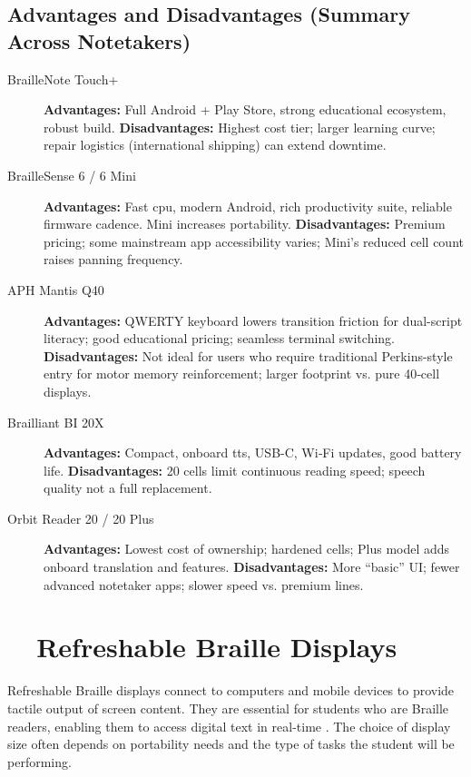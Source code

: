 \subsection*{Advantages and Disadvantages (Summary Across Notetakers)}
\begin{description}
	\item[BrailleNote Touch+] \textbf{Advantages:} Full Android + Play Store, strong educational ecosystem, robust build. \textbf{Disadvantages:} Highest cost tier; larger learning curve; repair logistics (international shipping) can extend downtime.
	\item[BrailleSense 6 / 6 Mini] \textbf{Advantages:} Fast \gls{cpu}, modern Android, rich productivity suite, reliable firmware cadence. Mini increases portability. \textbf{Disadvantages:} Premium pricing; some mainstream app accessibility varies; Mini’s reduced cell count raises panning frequency.
	\item[APH Mantis Q40] \textbf{Advantages:} QWERTY keyboard lowers transition friction for dual-script literacy; good educational pricing; seamless terminal switching. \textbf{Disadvantages:} Not ideal for users who require traditional Perkins-style entry for motor memory reinforcement; larger footprint vs. pure 40‑cell displays.
	\item[Brailliant BI 20X] \textbf{Advantages:} Compact, onboard \gls{tts}, USB-C, Wi‑Fi updates, good battery life. \textbf{Disadvantages:} 20 cells limit continuous reading speed; speech quality not a full  replacement.
	\item[Orbit Reader 20 / 20 Plus] \textbf{Advantages:} Lowest cost of ownership; hardened cells; Plus model adds onboard translation and features. \textbf{Disadvantages:} More “basic” UI; fewer advanced notetaker apps; slower  speed vs. premium lines.
\end{description}



\section{~~Refreshable Braille Displays}\label{ch3:sec:refreshable-braille}
Refreshable Braille displays connect to computers and mobile devices to provide tactile output of screen content. They are essential for students who are Braille readers, enabling them to access digital text in real-time \supercite{Presley2012, Kamei-Hannan2012, PerkinsBrailleDisplay}. The choice of display size often depends on portability needs and the type of tasks the student will be performing.

